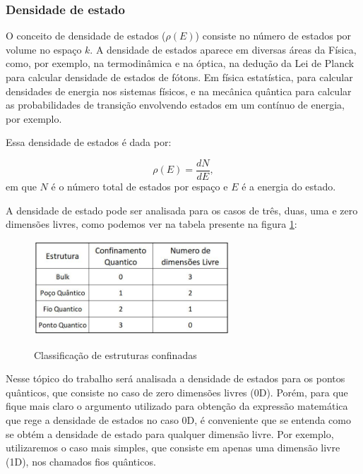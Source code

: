 \subsubsection{Densidade de estado}

	\par O conceito de densidade de estados ($\rho(E)$) consiste no número de estados por volume no espaço $k$. A densidade de estados aparece em diversas áreas da Física, como, por exemplo, na termodinâmica e na óptica, na dedução da Lei de Planck para calcular densidade de estados de fótons. Em física estatística, para calcular densidades de energia nos sistemas físicos, e na mecânica quântica para calcular as probabilidades de transição envolvendo estados em um contínuo de energia, por exemplo\cite{confinamento2}.

	\par Essa densidade de estados é dada por:

	\begin{equation}
		\label{confinamento_2}
		\rho(E) = \frac{dN}{dE},
	\end{equation}
	em que $N$ é o número total de estados por espaço e $E$ é a energia do estado.

	\par A densidade de estado pode ser analisada para os casos de três, duas, uma e zero dimensões livres, como podemos ver na tabela presente na figura \ref{fig10}:

	\begin{figure}[H]
	  \caption{Classificação de estruturas confinadas}
	  \centering
	  \includegraphics[width=0.65\textwidth]{images/figura10.jpg}
	  \label{fig10}
	\end{figure}

	\par Nesse tópico do trabalho será analisada a densidade de estados para os pontos quânticos, que consiste no caso de zero dimensões livres (0D). Porém, para que fique mais claro o argumento utilizado para obtenção da expressão matemática que rege a densidade de estados no caso 0D, é conveniente que se entenda como se obtém a densidade de estado para qualquer dimensão livre. Por exemplo, utilizaremos o caso mais simples, que consiste em apenas uma dimensão livre (1D), nos chamados fios quânticos.

